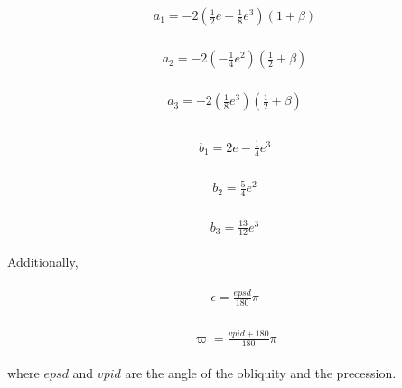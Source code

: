 \begin{eqnarray}
\begin{array}{l}
a_{1}=-2\left(\frac{1}{2} e+\frac{1}{8} e^{3}\right)(1+\beta)
\end{array}
\end{eqnarray}

\begin{eqnarray}
\begin{array}{l}
a_{2}=-2\left(-\frac{1}{4} e^{2}\right)\left(\frac{1}{2}+\beta\right)
\end{array}
\end{eqnarray}

\begin{eqnarray}
\begin{array}{l}
a_{3}=-2\left(\frac{1}{8} e^{3}\right)\left(\frac{1}{2}+\beta\right) \\
\end{array}
\end{eqnarray}

\begin{eqnarray}
\begin{array}{l}
b_{1}=2 e-\frac{1}{4} e^{3}
\end{array}
\end{eqnarray}

\begin{eqnarray}
\begin{array}{l}
b_{2}=\frac{5}{4} e^{2}
\end{array}
\end{eqnarray}

\begin{eqnarray}
\begin{array}{l}
b_{3}=\frac{13}{12} e^{3}
\end{array}
\end{eqnarray}

Additionally,

\begin{eqnarray}
\begin{array}{l}
\epsilon=\frac{e p s d}{180} \pi
\end{array}
\end{eqnarray}

\begin{eqnarray}
\begin{array}{l}
\varpi=\frac{v p i d+180}{180} \pi
\end{array}
\end{eqnarray}

where \(epsd\) and \(vpid\) are the angle of the obliquity and the
precession.

